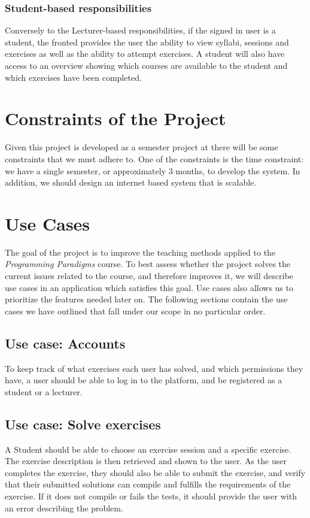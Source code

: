 \subsubsection{Student-based responsibilities}
Conversely to the Lecturer-based responsibilities, if the signed in user is a student, the fronted provides the user the ability to view syllabi, sessions and exercises as well as the ability to attempt exercises. A student will also have access to an overview showing which courses are available to the student and which exercises have been completed.


\section{Constraints of the Project}
Given this project is developed as a semester project at \aau{} there will be some constraints that we must adhere to.
One of the constraints is the time constraint: we have a single semester, or approximately 3 months, to develop the system.
In addition, we should design an internet based system that is scalable.

\section{Use Cases} \label{sec:use_cases}
The goal of the project is to improve the teaching methods applied to the \textit{Programming Paradigms} course.
To best assess whether the project solves the current issues related to the course, and therefore improves it, we will describe use cases in an application which satisfies this goal.
Use cases also allows us to prioritize the features needed later on.
The following sections contain the use cases we have outlined that fall under our scope in no particular order.

\subsection{Use case: Accounts}
To keep track of what exercises each user has solved, and which permissions they have, a user should be able to log in to the platform, and be registered as a student or a lecturer.

\subsection{Use case: Solve exercises} \label{sec:use-case-solve-exercises}
A Student should be able to choose an exercise session and a specific exercise. The exercise description is then retrieved and shown to the user.
As the user completes the exercise, they should also be able to submit the exercise, and verify that their submitted solutions can compile and fulfills the requirements of the exercise. If it does not compile or fails the tests, it should provide the user with an error describing the problem.

